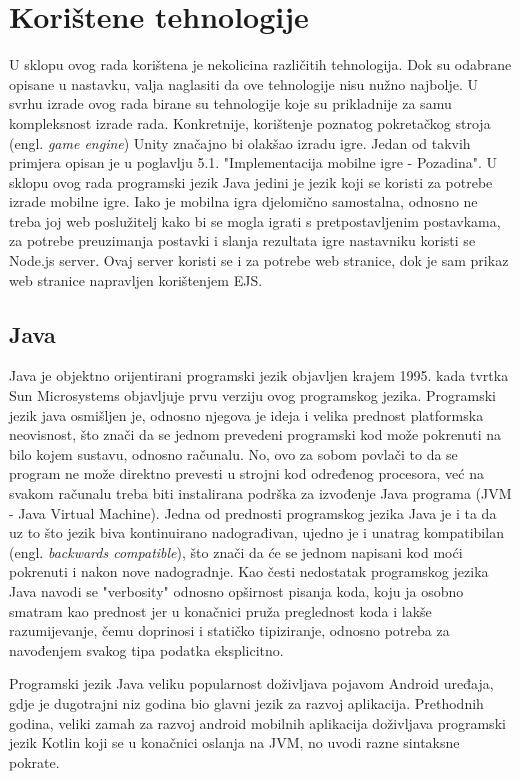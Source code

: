 \documentclass[times, utf8, zavrsni, numeric]{fer}
\begin{document}
\chapter{Korištene tehnologije}
U sklopu ovog rada korištena je nekolicina različitih tehnologija. Dok su odabrane opisane u nastavku, valja naglasiti da ove tehnologije nisu nužno najbolje. U svrhu izrade ovog rada birane su tehnologije koje su prikladnije za samu kompleksnost izrade rada.
Konkretnije, korištenje poznatog pokretačkog stroja (engl. \textit{game engine}) Unity značajno bi olakšao izradu igre. Jedan od takvih primjera opisan je u poglavlju 5.1. "Implementacija mobilne igre - Pozadina". 
U sklopu ovog rada programski jezik Java jedini je jezik koji se koristi za potrebe izrade mobilne igre. Iako je mobilna igra djelomično samostalna, odnosno ne treba joj web poslužitelj kako bi se mogla igrati s pretpostavljenim postavkama, za potrebe 
preuzimanja postavki i slanja rezultata igre nastavniku koristi se Node.js server. Ovaj server koristi se i za potrebe web stranice, dok je sam prikaz web stranice napravljen korištenjem EJS.


	\section{Java}
	Java je objektno orijentirani programski jezik objavljen krajem 1995. kada tvrtka Sun Microsystems objavljuje prvu verziju ovog programskog jezika. Programski jezik java osmišljen je, odnosno njegova je ideja i velika prednost platformska neovisnost,
	što znači da se jednom prevedeni programski kod može pokrenuti na bilo kojem sustavu, odnosno računalu. No, ovo za sobom povlači to da se program ne može direktno prevesti u strojni kod određenog procesora, već na svakom računalu treba biti
	instalirana podrška za izvođenje Java programa (JVM - Java Virtual Machine)\cite{mcjava}. 
	Jedna od prednosti programskog jezika Java je i ta da uz to što jezik biva kontinuirano nadograđivan, ujedno je i unatrag kompatibilan (engl. \textit{backwards compatible}), što znači da će se jednom napisani kod moći pokrenuti i nakon nove nadogradnje.
	Kao česti nedostatak programskog jezika Java navodi se "verbosity" odnosno opširnost pisanja koda, koju ja osobno smatram kao prednost jer u konačnici pruža preglednost koda i lakše razumijevanje, čemu doprinosi i statičko tipiziranje, odnosno 
	potreba za navođenjem svakog tipa podatka eksplicitno. 
	
	Programski jezik Java veliku popularnost doživljava pojavom Android uređaja, gdje je dugotrajni niz godina bio glavni jezik za razvoj aplikacija. Prethodnih godina, veliki zamah za razvoj android mobilnih aplikacija doživljava programski jezik 
	Kotlin koji se u konačnici oslanja na JVM, no uvodi razne sintaksne pokrate. 
	
\end{document}
